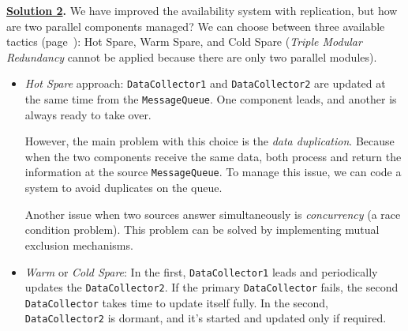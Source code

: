 \highspace
\textbf{\underline{Solution 2}.} We have improved the availability system with replication, but how are two parallel components managed? We can choose between three available tactics (page~\pageref{Replication approaches}): Hot Spare, Warm Spare, and Cold Spare (\emph{Triple Modular Redundancy} cannot be applied because there are only two parallel modules).
\begin{itemize}
    \item \emph{Hot Spare} approach: \texttt{DataCollector1} and \texttt{DataCollector2} are updated at the same time from the \texttt{MessageQueue}. One component leads, and another is always ready to take over.
    
    However, the main problem with this choice is the \emph{data duplication}. Because when the two components receive the same data, both process and return the information at the source \texttt{MessageQueue}. To manage this issue, we can code a system to avoid duplicates on the queue. 
    
    Another issue when two sources answer simultaneously is \emph{concurrency} (a race condition problem). This problem can be solved by implementing mutual exclusion mechanisms.


    \item \emph{Warm} or \emph{Cold Spare}: In the first, \texttt{DataCollector1} leads and periodically updates the \texttt{DataCollector2}. If the primary \texttt{DataCollector} fails, the second \texttt{DataCollector} takes time to update itself fully. In the second, \texttt{DataCollector2} is dormant, and it's started and updated only if required.
\end{itemize}
